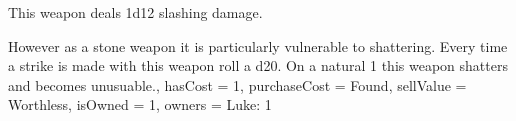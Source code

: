 \documentclass[8pt,twocolumn]{article}
\begin{document}
{{This weapon deals 1d12 slashing damage. 

However\comma{} as a stone weapon\comma{} it is particularly vulnerable to shattering. Every time a strike is made with this weapon\comma{} roll a d20. On a natural 1\comma{} this weapon shatters and becomes unusuable., 
	hasCost = 1, 
	purchaseCost = Found, 
	sellValue = Worthless, 
	isOwned = 1, 
	owners = Luke: 1\\
}
}


	
\end{document}
